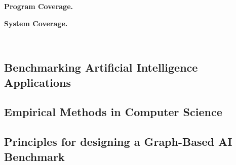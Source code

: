 \textbf{Program Coverage.}

\textbf{System Coverage.}


~\cite{DeMarzi2023}



\cite{Basak2021}


\subsection{Benchmarking Artificial Intelligence Applications}

\subsection{Empirical Methods in Computer Science}

\subsection{Principles for designing a Graph-Based AI Benchmark}